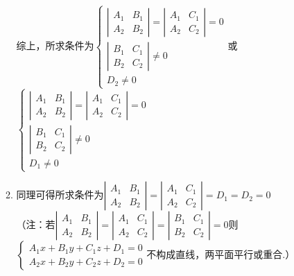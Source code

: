 \documentclass[UTF8]{ctexart}
\begin{document}
\begin{enumerate}
\begin{enumerate}[(1)]
综上，所求条件为$\left\{\begin{array}{l}\left|\begin{array}{cc}A_1&B_1\\A_2&B_2\end{array}\right|=\left|\begin{array}{cc}A_1&C_1\\A_2&C_2\end{array}\right|=0\\\left|\begin{array}{cc}B_1&C_1\\B_2&C_2\end{array}\right|\neq0\\D_2\neq0\end{array}\right.$或$\left\{\begin{array}{l}\left|\begin{array}{cc}A_1&B_1\\A_2&B_2\end{array}\right|=\left|\begin{array}{cc}A_1&C_1\\A_2&C_2\end{array}\right|=0\\\left|\begin{array}{cc}B_1&C_1\\B_2&C_2\end{array}\right|\neq0\\D_1\neq0\end{array}\right.$
\item 同理可得所求条件为$\left|\begin{array}{cc}A_1&B_1\\A_2&B_2\end{array}\right|=\left|\begin{array}{cc}A_1&C_1\\A_2&C_2\end{array}\right|=D_1=D_2=0$\\
（注：若$\left|\begin{array}{cc}A_1&B_1\\A_2&B_2\end{array}\right|=\left|\begin{array}{cc}A_1&C_1\\A_2&C_2\end{array}\right|=\left|\begin{array}{cc}B_1&C_1\\B_2&C_2\end{array}\right|=0$则$\left\{\begin{array}{l}A_1x+B_1y+C_1z+D_1=0\\A_2x+B_2y+C_2z+D_2=0\end{array}\right.$不构成直线，两平面平行或重合.）
\end{enumerate}


\end{enumerate}
\end{document}
